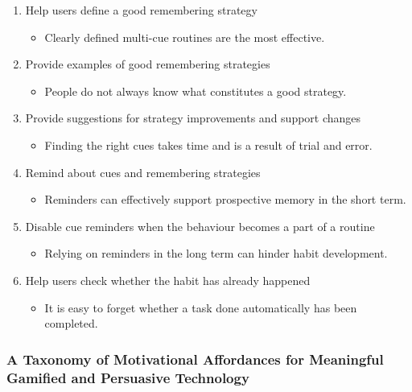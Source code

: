   \begin{enumerate}

    \item Help users define a good remembering strategy
      \begin{itemize}
        \item Clearly defined multi-cue routines are the most effective.
      \end{itemize}

    \item Provide examples of good remembering strategies
      \begin{itemize}
        \item People do not always know what constitutes a good strategy.
      \end{itemize}

    \item Provide suggestions for strategy improvements and support changes
      \begin{itemize}
        \item Finding the right cues takes time and is a result of trial and error.
      \end{itemize}

    \item Remind about cues and remembering strategies
      \begin{itemize}
        \item Reminders can effectively support prospective memory in the short term.
      \end{itemize}

    \item Disable cue reminders when the behaviour becomes a part of a routine
      \begin{itemize}
        \item Relying on reminders in the long term can hinder habit development.
      \end{itemize}

    \item Help users check whether the habit has already happened
      \begin{itemize}
        \item It is easy to forget whether a task done automatically has been completed.
    \end{itemize}

  \end{enumerate}

\subsubsection*{A Taxonomy of Motivational Affordances for Meaningful Gamified and Persuasive Technology}

